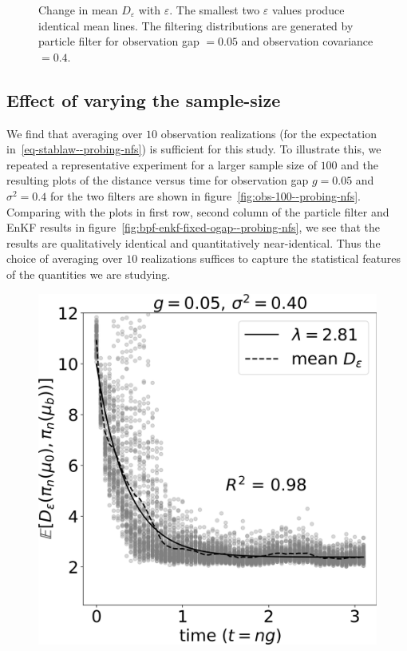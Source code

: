 {\begin{figure}
    \caption{Change in mean $D_\varepsilon$ with $\varepsilon$. The smallest two  $\varepsilon$ values produce identical mean lines. The filtering distributions are generated by particle filter for observation gap  $=0.05$ and observation covariance $=0.4$.}
    \label{fig:bpf-eps-all--probing-nfs}
\end{figure}
}

{\color{mypink}\subsection{Effect of varying the sample-size}\label{ssec-sample-size--probing-nfs}
We find that averaging over $10$ observation realizations (for the expectation in~\eqref{eq-stablaw--probing-nfs}) is sufficient for this study. To illustrate this, we repeated a representative experiment for a larger sample size  of $100$ and the resulting plots of the distance versus time for observation gap $g=0.05$ and $\sigma^2=0.4$ for the two filters are shown in figure~\ref{fig:obs-100--probing-nfs}. Comparing with the plots in first row, second column of the particle filter and EnKF results in figure~\ref{fig:bpf-enkf-fixed-ogap--probing-nfs}, we see that the results are qualitatively identical and quantitatively near-identical. Thus the choice of averaging over $10$ realizations suffices to capture the statistical features of the quantities we are studying.
\begin{figure}
    \includegraphics[scale=0.45]{probing-nfs/plots/plots-bpf-rate_obs_100.png}

\end{figure}}
